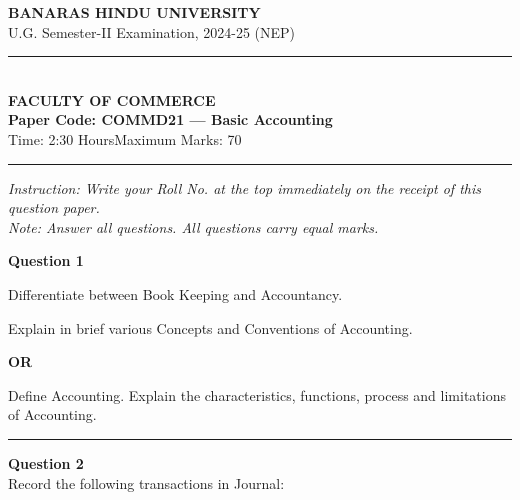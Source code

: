 \documentclass[11pt,a4paper]{article}
\begin{document}
\begin{center}
  {\large\bfseries BANARAS HINDU UNIVERSITY}\\[2pt]
  {\normalsize U.G. Semester-II Examination, 2024-25 (NEP)}\\[6pt]
  \rule{0.8\linewidth}{0.5pt}\\[6pt]
  {\large\bfseries FACULTY OF COMMERCE}\\[4pt]
  {\large\bfseries Paper Code: COMMD21 --- Basic Accounting}\\[4pt]
  {\normalsize Time: 2:30 Hours\hfill Maximum Marks: 70}
\end{center}

\rule{\linewidth}{0.4pt}\smallskip



\noindent   \textit{Instruction: Write your Roll No. at the top immediately on the receipt of this question paper.}\\[2pt]



\noindent   \textit{Note: Answer all questions. All questions carry equal marks.}
\bigskip




\noindent   \textbf{Question 1}

\begin{parts}
  \item Differentiate between Book Keeping and Accountancy.
  \item Explain in brief various Concepts and Conventions of Accounting.
\end{parts}


\begin{center}   \textbf{OR}\end{center}

Define Accounting. Explain the characteristics, functions, process and limitations of Accounting.

\medskip\rule{\linewidth}{0.2pt}\medskip




\noindent   \textbf{Question 2} \\
Record the following transactions in Journal:
\end{document}

